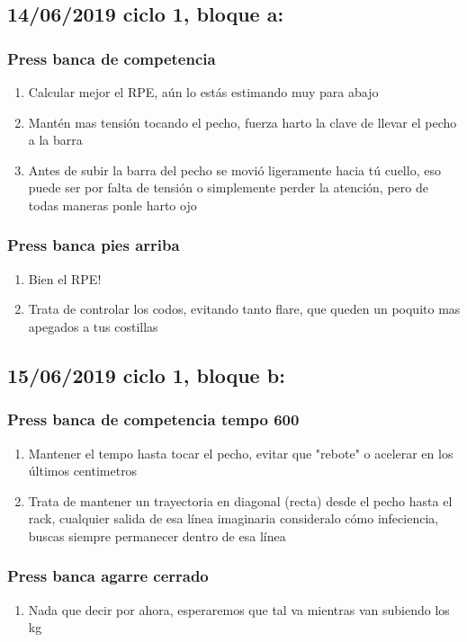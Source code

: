 \documentclass[11pt]{article}
\begin{document}
\subsection{14/06/2019 ciclo 1, bloque a:}
\label{sec:orgf75da05}
\subsubsection{Press banca de competencia}
\label{sec:orga5df66d}
\begin{enumerate}
\item Calcular mejor el RPE, aún lo estás estimando muy para abajo
\item Mantén mas tensión tocando el pecho, fuerza harto la clave de llevar el pecho a la barra
\item Antes de subir la barra del pecho se movió ligeramente hacia tú
cuello, eso puede ser por falta de tensión o simplemente perder la
atención, pero de todas maneras ponle harto ojo
\end{enumerate}
\subsubsection{Press banca pies arriba}
\label{sec:orgabe13f3}
\begin{enumerate}
\item Bien el RPE!
\item Trata de controlar los codos, evitando tanto flare, que queden un
poquito mas apegados a tus costillas
\end{enumerate}
\subsection{15/06/2019 ciclo 1, bloque b:}
\label{sec:orga27b74e}
\subsubsection{Press banca de competencia tempo 600}
\label{sec:org507971d}
\begin{enumerate}
\item Mantener el tempo hasta tocar el pecho, evitar que "rebote" o acelerar en los últimos centimetros
\item Trata de mantener un trayectoria en diagonal (recta) desde el pecho
hasta el rack, cualquier salida de esa línea imaginaria consideralo
cómo infeciencia, buscas siempre permanecer dentro de esa línea
\end{enumerate}
\subsubsection{Press banca agarre cerrado}
\label{sec:org1e59ab2}
\begin{enumerate}
\item Nada que decir por ahora, esperaremos que tal va mientras van
subiendo los kg
\end{enumerate}
\end{document}
